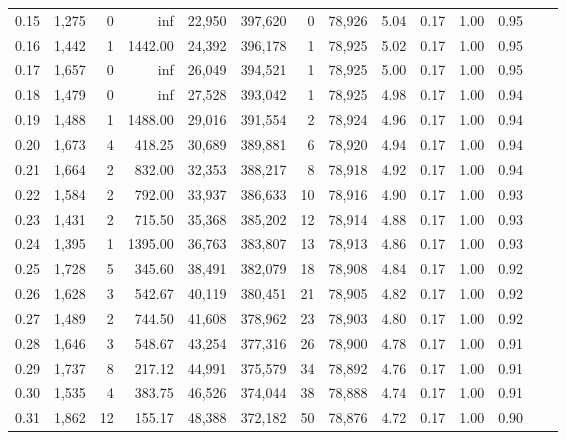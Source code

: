 \begin{tabular}{rrrrrrrrrrrrrr}
0.15 &   1,275 &      0 &      inf &   22,950 &  397,620 &       0 &  78,926 &  5.04 &  0.17 &  1.00 &      0.95 \\
0.16 &   1,442 &      1 &  1442.00 &   24,392 &  396,178 &       1 &  78,925 &  5.02 &  0.17 &  1.00 &      0.95 \\
0.17 &   1,657 &      0 &      inf &   26,049 &  394,521 &       1 &  78,925 &  5.00 &  0.17 &  1.00 &      0.95 \\
0.18 &   1,479 &      0 &      inf &   27,528 &  393,042 &       1 &  78,925 &  4.98 &  0.17 &  1.00 &      0.94 \\
0.19 &   1,488 &      1 &  1488.00 &   29,016 &  391,554 &       2 &  78,924 &  4.96 &  0.17 &  1.00 &      0.94 \\
0.20 &   1,673 &      4 &   418.25 &   30,689 &  389,881 &       6 &  78,920 &  4.94 &  0.17 &  1.00 &      0.94 \\
0.21 &   1,664 &      2 &   832.00 &   32,353 &  388,217 &       8 &  78,918 &  4.92 &  0.17 &  1.00 &      0.94 \\
0.22 &   1,584 &      2 &   792.00 &   33,937 &  386,633 &      10 &  78,916 &  4.90 &  0.17 &  1.00 &      0.93 \\
0.23 &   1,431 &      2 &   715.50 &   35,368 &  385,202 &      12 &  78,914 &  4.88 &  0.17 &  1.00 &      0.93 \\
0.24 &   1,395 &      1 &  1395.00 &   36,763 &  383,807 &      13 &  78,913 &  4.86 &  0.17 &  1.00 &      0.93 \\
0.25 &   1,728 &      5 &   345.60 &   38,491 &  382,079 &      18 &  78,908 &  4.84 &  0.17 &  1.00 &      0.92 \\
0.26 &   1,628 &      3 &   542.67 &   40,119 &  380,451 &      21 &  78,905 &  4.82 &  0.17 &  1.00 &      0.92 \\
0.27 &   1,489 &      2 &   744.50 &   41,608 &  378,962 &      23 &  78,903 &  4.80 &  0.17 &  1.00 &      0.92 \\
0.28 &   1,646 &      3 &   548.67 &   43,254 &  377,316 &      26 &  78,900 &  4.78 &  0.17 &  1.00 &      0.91 \\
0.29 &   1,737 &      8 &   217.12 &   44,991 &  375,579 &      34 &  78,892 &  4.76 &  0.17 &  1.00 &      0.91 \\
0.30 &   1,535 &      4 &   383.75 &   46,526 &  374,044 &      38 &  78,888 &  4.74 &  0.17 &  1.00 &      0.91 \\
0.31 &   1,862 &     12 &   155.17 &   48,388 &  372,182 &      50 &  78,876 &  4.72 &  0.17 &  1.00 &      0.90 \\

\end{tabular}
